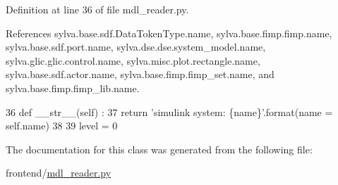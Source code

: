 Definition at line 36 of file mdl\+\_\+reader.\+py.



References sylva.\+base.\+sdf.\+Data\+Token\+Type.\+name, sylva.\+base.\+fimp.\+fimp.\+name, sylva.\+base.\+sdf.\+port.\+name, sylva.\+dse.\+dse.\+system\+\_\+model.\+name, sylva.\+glic.\+glic.\+control.\+name, sylva.\+misc.\+plot.\+rectangle.\+name, sylva.\+base.\+sdf.\+actor.\+name, sylva.\+base.\+fimp.\+fimp\+\_\+set.\+name, and sylva.\+base.\+fimp.\+fimp\+\_\+lib.\+name.


\begin{DoxyCode}
36     \textcolor{keyword}{def }\_\_str\_\_(self) :
37       \textcolor{keywordflow}{return} \textcolor{stringliteral}{'simulink system: \{name\}'}.format(name = self.name)
38 
39   level = 0
\end{DoxyCode}


The documentation for this class was generated from the following file\+:\begin{DoxyCompactItemize}
\item 
frontend/\hyperlink{mdl__reader_8py}{mdl\+\_\+reader.\+py}\end{DoxyCompactItemize}
